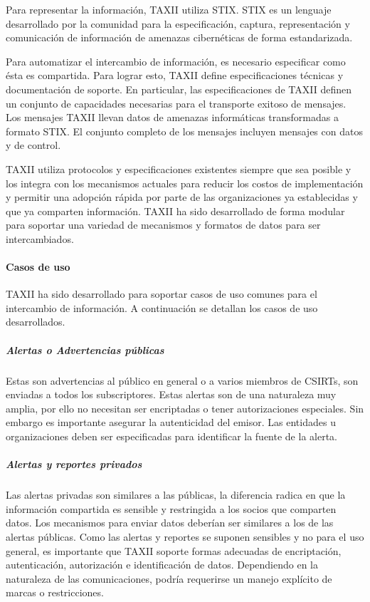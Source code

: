 Para representar la información, TAXII utiliza STIX. STIX es un 
lenguaje desarrollado por la comunidad para la especificación, captura, 
representación y comunicación de información de amenazas cibernéticas de forma 
estandarizada.

Para automatizar el intercambio de información, es necesario especificar como 
ésta es compartida. Para lograr esto, TAXII define especificaciones técnicas y 
documentación de soporte. En particular, las especificaciones de TAXII definen 
un conjunto de capacidades necesarias para el transporte exitoso de mensajes. 
Los mensajes TAXII llevan datos de amenazas informáticas transformadas a 
formato STIX. El conjunto completo de los mensajes incluyen mensajes con datos y 
de control.

TAXII utiliza protocolos y especificaciones existentes siempre que sea posible y 
los integra con los mecanismos actuales para reducir los costos de 
implementación y permitir una adopción rápida por parte de las organizaciones ya 
establecidas y que ya comparten información. TAXII ha sido desarrollado de forma 
modular para soportar una variedad de mecanismos y formatos de datos para ser 
intercambiados.

\paragraph{Casos de uso}

TAXII ha sido desarrollado para soportar casos de uso comunes para el 
intercambio de información. A continuación se detallan los casos de uso 
desarrollados.

\subparagraph{Alertas o Advertencias públicas}

Estas son advertencias al público en general o a varios miembros de CSIRTs, son 
enviadas a todos los subscriptores. Estas alertas son de una naturaleza muy 
amplia, por ello no necesitan ser encriptadas o tener autorizaciones especiales. 
Sin embargo es importante asegurar la autenticidad del emisor. Las entidades u 
organizaciones deben ser especificadas para identificar la fuente de la alerta.

\subparagraph{Alertas y reportes privados}

Las alertas privadas son similares a las públicas, la diferencia radica en que 
la información compartida es sensible y restringida a los socios que 
comparten datos. Los mecanismos para enviar datos deberían ser similares a los 
de las alertas públicas. Como las alertas y reportes se suponen sensibles y no 
para el uso general, es importante que TAXII soporte formas adecuadas de 
encriptación, autenticación, autorización e identificación de datos. Dependiendo 
en la naturaleza de las comunicaciones, podría requerirse un manejo explícito de 
marcas o restricciones.

